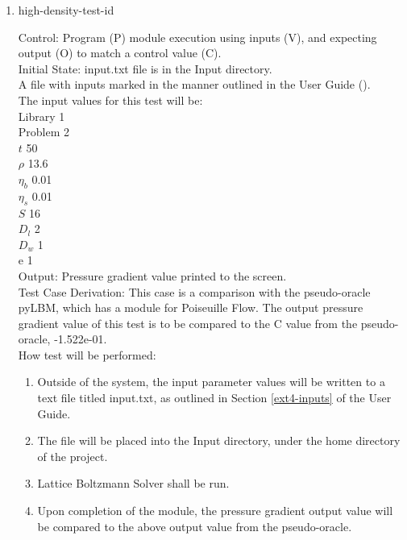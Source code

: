 \documentclass[12pt, titlepage]{article}
\newcommand{\famname}{Lattice Boltzmann Solver}
\newcounter{testcounter} %
\begin{document}
\begin{enumerate}
\item{high-density-test-id\thetestcounter \\}

Control: Program (P) module execution using inputs (V), and expecting output (O)
to match a control value (C).\\
					
Initial State: input.txt file is in the Input directory.\\
					
A file with inputs marked in the manner outlined in the User
Guide (\citet{LBM_UserGuide_PM}).\\The input values for this test will be:\\
Library 1\\
Problem 2\\
$t$ 50\\
$\rho$ 13.6\\
$\eta_b$ 0.01\\
$\eta_s$ 0.01\\
$S$ 16\\
$D_{l}$ 2\\
$D_{w}$ 1\\
$\mathrm{e}$ 1\\

Output: Pressure gradient value printed to the screen.  \\

Test Case Derivation: This case is a comparison with the pseudo-oracle pyLBM,
which has a module for Poiseuille Flow. The output pressure gradient value of
this test is to be compared to the C value from the pseudo-oracle,
-1.522e-01.\\

How test will be performed: 

\begin{enumerate}
\item Outside of the system, the input parameter values will be written to a text file titled input.txt, as outlined in Section \ref{ext4-inputs} of the User Guide.
\item The file will be placed into the Input directory, under the home directory
of the project.
\item {\famname} shall be run.
\item Upon completion of the module, the pressure gradient output value will be
compared to the above output value from the pseudo-oracle.
\end{enumerate}	


\end{enumerate}
\end{document}
